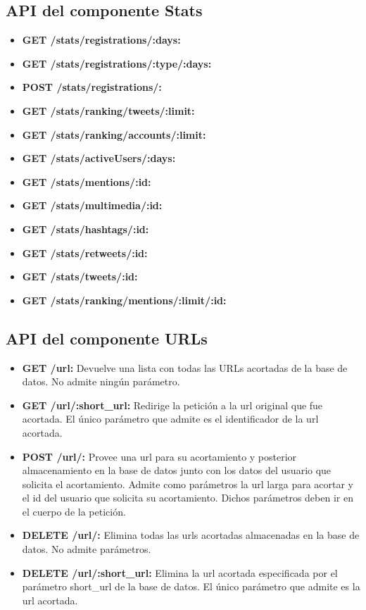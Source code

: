 \documentclass[a4paper]{article}
\begin{document}
	\subsection{API del componente Stats}
	\begin{itemize}
		\item \textbf{GET /stats/registrations/:days:} 
		\item \textbf{GET /stats/registrations/:type/:days:} 
		\item \textbf{POST /stats/registrations/:} 
		\item \textbf{GET /stats/ranking/tweets/:limit:} 
		\item \textbf{GET /stats/ranking/accounts/:limit:} 
		\item \textbf{GET /stats/activeUsers/:days:} 
		\item \textbf{GET /stats/mentions/:id:} 
		\item \textbf{GET /stats/multimedia/:id:}
		\item \textbf{GET /stats/hashtags/:id:} 
		\item \textbf{GET /stats/retweets/:id:}
		\item \textbf{GET /stats/tweets/:id:}
		\item \textbf{GET /stats/ranking/mentions/:limit/:id:}  
	\end{itemize}
	\subsection{API del componente URLs}
	\begin{itemize}
		\item \textbf{GET /url:} Devuelve una lista con todas las URLs acortadas de la base de datos. No admite ningún parámetro.
		\item \textbf{GET /url/:short\_url:} Redirige la petición a la url original que fue acortada. El único parámetro que admite es el identificador de la url acortada.
		\item \textbf{POST /url/:} Provee una url para su acortamiento y posterior almacenamiento en la base de datos junto con los datos del usuario que solicita el acortamiento. Admite como parámetros la url larga para acortar y el id del usuario que solicita su acortamiento. Dichos parámetros deben ir en el cuerpo de la petición.
		\item \textbf{DELETE /url/:} Elimina todas las urls acortadas almacenadas en la base de datos. No admite parámetros.
		\item \textbf{DELETE /url/:short\_url:} Elimina la url acortada especificada por el parámetro short\_url de la base de datos. El único parámetro que admite es la url acortada.
	\end{itemize}
	
\end{document}
